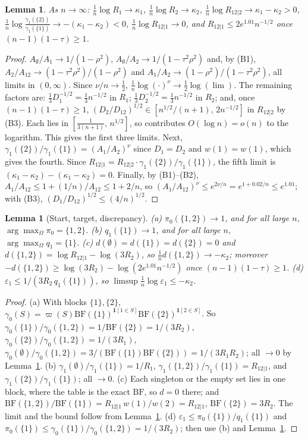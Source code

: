 \documentclass[11pt]{article}
\newtheorem{lemma}[theorem]{Lemma}
\theoremstyle{remark}
\newcommand{\BF}{\mathrm{BF}}
\newcommand{\Om}{\Omega}
\newcommand{\eps}{\varepsilon}
\begin{document}
\begin{lemma}\label{lem:asym}
As $n\to\infty$: $\frac1n\log R_1\to\kappa_1$, $\frac1n\log R_2\to\kappa_2$, $\frac1n\log R_{12|2}\to\kappa_1-\kappa_2>0$, $\frac1n\log\frac{\gamma_1(\{2\})}{\gamma_1(\{1\})}\to-(\kappa_1-\kappa_2)<0$, $\frac1n\log R_{12|1}\to0$, and $R_{12|1}\le 2e^{1.01}n^{-1/2}$ once $(n-1)(1-\tau)\ge1$.
\end{lemma}
\begin{proof}
$A_\emptyset/A_1\to1/(1-\rho^2)$, $A_\emptyset/A_2\to1/(1-\tau^2\rho^2)$ and, by (B1), $A_2/A_{12}\to(1-\tau^2\rho^2)/(1-\rho^2)$ and $A_1/A_2\to(1-\rho^2)/(1-\tau^2\rho^2)$, all limits in $(0,\infty)$. Since $\nu/n\to\frac12$, $\frac1n\log(\cdot)^\nu\to\frac12\log(\lim)$. The remaining factors are: $\frac13 D_1^{-1/2}=\frac13n^{-1/2}$ in $R_1$; $\frac13D_2^{-1/2}=\frac13n^{-1/2}$ in $R_2$; and, once $(n-1)(1-\tau)\ge1$, $(D_2/D_{12})^{1/2}\in[n^{1/2}/(n+1),\,2n^{-1/2}]$ in $R_{12|2}$ by (B3). Each lies in $[\frac1{3(n+1)},\,n^{1/2}]$, so contributes $O(\log n)=o(n)$ to the logarithm. This gives the first three limits. Next, $\gamma_1(\{2\})/\gamma_1(\{1\})=(A_1/A_2)^\nu$ since $D_1=D_2$ and $w(1)=w(1)$, which gives the fourth. Since $R_{12|1}=R_{12|2}\cdot\gamma_1(\{2\})/\gamma_1(\{1\})$, the fifth limit is $(\kappa_1-\kappa_2)-(\kappa_1-\kappa_2)=0$. Finally, by (B1)--(B2), $A_1/A_{12}\le1+(1/n)/A_{12}\le1+2/n$, so $(A_1/A_{12})^\nu\le e^{2\nu/n}=e^{1+0.02/n}\le e^{1.01}$; with (B3), $(D_1/D_{12})^{1/2}\le(4/n)^{1/2}$.
\end{proof}

\begin{lemma}[Start, target, discrepancy]\label{lem:fam}
(a) $\pi_0(\{1,2\})\to1$, and for all large $n$, $\arg\max_\Om\pi_0=\{1,2\}$. (b) $q_1(\{1\})\to1$, and for all large $n$, $\arg\max_\Om q_1=\{1\}$. (c) $d(\emptyset)=d(\{1\})=d(\{2\})=0$ and $d(\{1,2\})=\log R_{12|1}-\log(3R_2)$, so $\frac1n d(\{1,2\})\to-\kappa_2$; moreover $-d(\{1,2\})\ge\log(3R_2)-\log(2e^{1.01}n^{-1/2})$ once $(n-1)(1-\tau)\ge1$. (d) $\eps_1\le 1/(3R_2\,q_1(\{1\}))$, so $\limsup\frac1n\log\eps_1\le-\kappa_2$.
\end{lemma}
\begin{proof}
(a) With blocks $\{1\},\{2\}$, $\gamma_0(S)=\varpi(S)\BF(\{1\})^{\mathbf 1[1\in S]}\BF(\{2\})^{\mathbf 1[2\in S]}$. So $\gamma_0(\{1\})/\gamma_0(\{1,2\})=1/\BF(\{2\})=1/(3R_2)$, $\gamma_0(\{2\})/\gamma_0(\{1,2\})=1/(3R_1)$, $\gamma_0(\emptyset)/\gamma_0(\{1,2\})=3/(\BF(\{1\})\BF(\{2\}))=1/(3R_1R_2)$; all $\to0$ by Lemma~\ref{lem:asym}. (b) $\gamma_1(\emptyset)/\gamma_1(\{1\})=1/R_1$, $\gamma_1(\{1,2\})/\gamma_1(\{1\})=R_{12|1}$, and $\gamma_1(\{2\})/\gamma_1(\{1\})$; all $\to0$. (c) Each singleton or the empty set lies in one block, where the table is the exact $\BF$, so $d=0$ there; and $\BF(\{1,2\})/\BF(\{1\})=R_{12|1}\,w(1)/w(2)=R_{12|1}$, $\BF(\{2\})=3R_2$. The limit and the bound follow from Lemma~\ref{lem:asym}. (d) $\eps_1\le\pi_0(\{1\})/q_1(\{1\})$ and $\pi_0(\{1\})\le\gamma_0(\{1\})/\gamma_0(\{1,2\})=1/(3R_2)$; then use (b) and Lemma~\ref{lem:asym}.
\end{proof}
\end{document}
